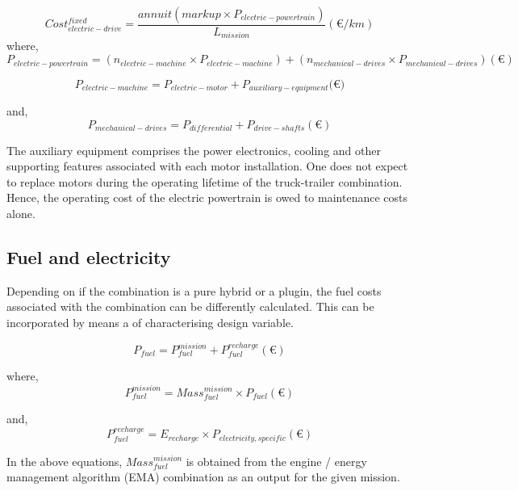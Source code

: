 \documentclass[ExampleMasters.tex]{subfiles}
\begin{document}
			\begin{equation}
				Cost_{electric-drive}^{fixed} = \frac{annuit(markup \times P_{electric-powertrain})}{L_{mission}} (\euro{}/km)
			\end{equation}
			where,
			\begin{equation}
				P_{electric-powertrain} = (n_{electric-machine} \times P_{electric-machine}) + (n_{mechanical-drives} \times P_{mechanical-drives}) (\euro{})
			\end{equation}

			\begin{equation}
				P_{electric-machine} = P_{electric-motor}+P_{auxiliary-equipment} (\euro{)}
			\end{equation}

			and,
			\begin{equation}
				P_{mechanical-drives} = P_{differential}+P_{drive-shafts} (\euro{})
			\end{equation}

			The auxiliary equipment comprises the power electronics, cooling and other supporting features associated with each motor installation. One does not expect to replace motors during the operating lifetime of the truck-trailer combination. Hence, the operating cost of the electric powertrain is owed to maintenance costs alone.

		\subsection{Fuel and electricity}
			Depending on if the combination is a pure hybrid or a plugin, the fuel costs associated with the combination can be differently calculated. This can be incorporated by means a of characterising design variable.

			\begin{equation}
				P_{fuel} = P_{fuel}^{mission}+P_{fuel}^{recharge} (\euro{})
			\end{equation}

			where,
			\begin{equation}
				P_{fuel}^{mission} = Mass_{fuel}^{mission} \times P_{fuel} (\euro{})
			\end{equation}

			and,
			\begin{equation}
				P_{fuel}^{recharge} = E_{recharge} \times P_{electricity, specific} (\euro{})
			\end{equation}

			In the above equations, $Mass_{fuel}^{mission}$ is obtained from the engine / energy management algorithm (EMA) combination as an output for the given mission.
\end{document}
